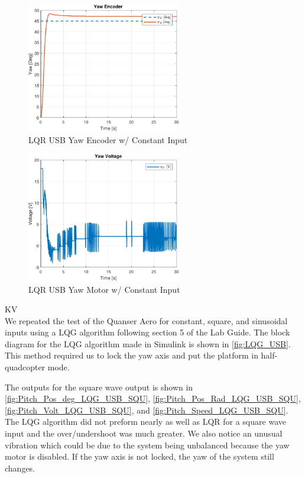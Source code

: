 \documentclass[fontsize=11pt, %
                             paper=letter, %
                             openany, %
                             captions=tableheading,
                             index=totoc,
                             hyperref]{labbook}
\begin{document}
\begin{addmargin}[0cm]{0cm}
\begin{figure}[H]
  \centering
  \includegraphics[width=0.6\textwidth]{figs/matlab/LQR_USB/Yaw_Pos_LQR_USB_CON}
  \caption{LQR USB Yaw Encoder w/ Constant Input}
  \label{fig:Yaw_Pos_LQR_USB_CON}
\end{figure}

\begin{figure}[H]
  \centering
  \includegraphics[width=0.6\textwidth]{figs/matlab/LQR_USB/Yaw_Volt_LQR_USB_CON}
  \caption{LQR USB Yaw Motor w/ Constant Input}
  \label{fig:Yaw_Volt_LQR_USB_CON}
\end{figure}

KV\\
We repeated the test of the Quanser Aero for constant, square, and sinusoidal inputs using a LQG algorithm following section 5 of the Lab Guide\cite{LQR_Lab_Guide}.  The block diagram for the LQG algorithm made in Simulink is shown in \autoref{fig:LQG_USB}.  This method required us to lock the yaw axis and put the platform in half-quadcopter mode.

The outputs for the square wave output is shown in
\autoref{fig:Pitch_Pos_deg_LQG_USB_SQU},
\autoref{fig:Pitch_Pos_Rad_LQG_USB_SQU},
\autoref{fig:Pitch_Volt_LQG_USB_SQU}, and
\autoref{fig:Pitch_Speed_LQG_USB_SQU}.  
The LQG algorithm did not preform nearly as well as LQR for a square wave input and the over/undershoot was much greater.  We also notice an unusual vibration which could be due to the system being unbalanced because the yaw motor is disabled.  If the yaw axis is not locked, the yaw of the system still changes.


\end{addmargin}
\end{document}
